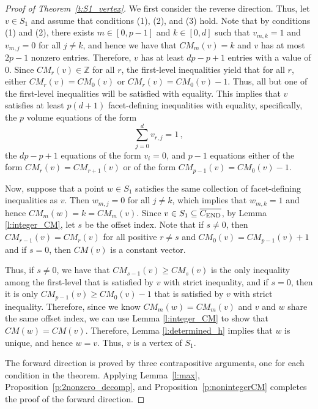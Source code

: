 \documentclass[12pt]{amsart}
\theoremstyle{definition}
\numberwithin{equation}{section}
\renewcommand\>{\rangle}
\newcommand\<{\langle}
\newcommand\0{\mathbf{0}}
\newcommand\ZZ{\mathbb{Z}}
\newcommand{\CEND}{C_\textnormal{END}}
\begin{document}
\begin{proof}[Proof of Theorem~\ref{t:S1_vertex}]
	We first consider the reverse direction.
	Thus, let $v \in S_1$ and assume that conditions (1), (2), and (3) hold.
	Note that by conditions (1) and (2), there exists $m \in [0,p-1]$ and $k \in [0,d]$ such that $v_{m,k} = 1$ and $v_{m,j}=0$ for all $j\neq k$, and hence we have that $CM_m(v) = k$ and $v$ has at most $2p - 1$ nonzero entries. 
	Therefore, $v$ has at least $dp - p + 1$ entries with a value of 0. Since $CM_r(v)\in\ZZ$ for all $r$, the first-level inequalities yield that for all $r$, either $CM_r(v) = CM_0(v)$ or $CM_r(v) = CM_0(v) - 1$.
	Thus, all but one of the first-level inequalities will be satisfied with equality. 
	This implies that $v$ satisfies at least $p(d+1)$ facet-defining inequalities with equality, specifically, the $p$ volume equations of the form 
	\[
	\sum_{j=0}^d v_{r,j} = 1 \, ,
	\]
	the $dp - p + 1$ equations of the form $v_i = 0$, and $p-1$ equations either of the form $CM_r(v) = CM_{r+1}(v)$ or of the form $CM_{p-1}(v) = CM_{0}(v) - 1$.
	
	Now, suppose that a point $w\in S_1$ satisfies the same collection of facet-defining inequalities as $v$.
	Then $w_{m,j} =0$ for all $j\neq k$, which implies that $w_{m,k}=1$ and hence $CM_m(w) = k = CM_m(v)$.
	Since $v \in S_1 \subseteq \overline{\CEND}$, by Lemma \ref{l:integer_CM}, let $s$ be the offset index. Note that if $s \neq 0$, then $CM_{r-1}(v) = CM_{r}(v)$ for all positive $r \neq s$ and $CM_0(v) = CM_{p-1}(v) + 1$ and if $s = 0$, then $CM(v)$ is a constant vector.
	
	Thus, if $s \neq 0$, we have that $CM_{s-1}(v) \geq CM_s(v)$ is the only inequality among the first-level that is satisfied by $v$ with strict inequality, and if $s = 0$, then it is only $CM_{p-1}(v) \geq CM_{0}(v) - 1$ that is satisfied by $v$ with strict inequality. Therefore, since we know $CM_m(w) = CM_m(v)$ and $v$ and $w$ share the same offset index, we can use Lemma \ref{l:integer_CM} to show that $CM(w) = CM(v)$.
	Therefore, Lemma \ref{l:determined_h} implies that $w$ is unique, and hence $w=v$.
	Thus, $v$ is a vertex of $S_1$.
	
	The forward direction is proved by three contrapositive arguments, one for each condition in the theorem.
	Applying Lemma~\ref{l:max}, Proposition~\ref{p:2nonzero_decomp}, and Proposition~\ref{p:nonintegerCM} completes the proof of the forward direction.
\end{proof}
\end{document}
